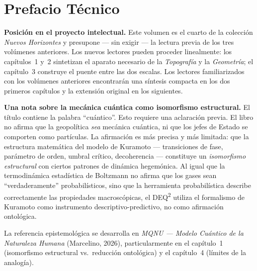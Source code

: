 \documentclass[12pt, twoside]{book}
\theoremstyle{plain}
\theoremstyle{definition}
\theoremstyle{remark}
\begin{document}
\tableofcontents
\cleardoublepage

\chapter*{Prefacio T\'{e}cnico}

\textbf{Posici\'{o}n en el proyecto intelectual.}
Este volumen es el cuarto de la colecci\'{o}n \textit{Nuevos Horizontes} y presupone --- sin exigir --- la lectura previa de los tres vol\'{u}menes anteriores. Los nuevos lectores pueden proceder linealmente: los cap\'{i}tulos~1 y~2 sintetizan el aparato necesario de la \textit{Topograf\'{i}a} y la \textit{Geometr\'{i}a}; el cap\'{i}tulo~3 construye el puente entre las dos escalas. Los lectores familiarizados con los vol\'{u}menes anteriores encontrar\'{a}n una s\'{i}ntesis compacta en los dos primeros cap\'{i}tulos y la extensi\'{o}n original en los siguientes.

\textbf{Una nota sobre la mec\'{a}nica cu\'{a}ntica como isomorfismo estructural.}
El t\'{i}tulo contiene la palabra ``cu\'{a}ntico''. Esto requiere una aclaraci\'{o}n previa. El libro no afirma que la geopolítica \textit{sea} mec\'{a}nica cu\'{a}ntica, ni que los jefes de Estado se comporten como part\'{i}culas. La afirmaci\'{o}n es m\'{a}s precisa y m\'{a}s limitada: que la estructura matem\'{a}tica del modelo de Kuramoto --- transiciones de fase, par\'{a}metro de orden, umbral cr\'{i}tico, decoherencia --- constituye un \textit{isomorfismo estructural} con ciertos patrones de din\'{a}mica hegem\'{o}nica. Al igual que la termodin\'{a}mica estad\'{i}stica de Boltzmann no afirma que los gases sean ``verdaderamente'' probabil\'{i}sticos, sino que la herramienta probabil\'{i}stica describe correctamente las propiedades macrosc\'{o}picas, el DEQ\textsuperscript{2} utiliza el formalismo de Kuramoto como instrumento descriptivo-predictivo, no como afirmaci\'{o}n ontol\'{o}gica.

La referencia epistemol\'{o}gica se desarrolla en \textit{MQNU --- Modelo Cu\'{a}ntico de la Naturaleza Humana} (Marcelino, 2026), particularmente en el cap\'{i}tulo~1 (isomorfismo estructural vs.\ reducci\'{o}n ontol\'{o}gica) y el cap\'{i}tulo~4 (l\'{i}mites de la analog\'{i}a).
\end{document}
